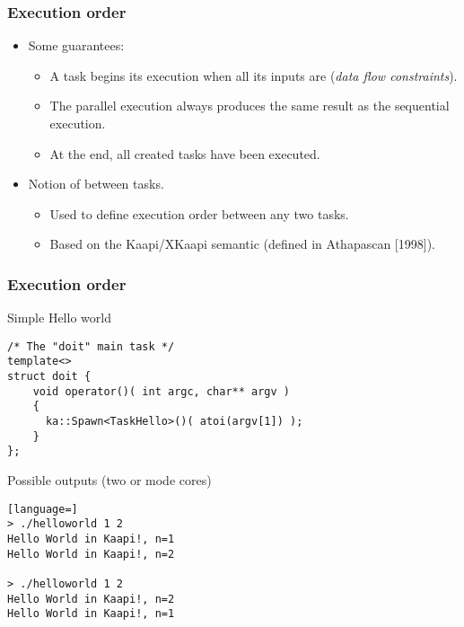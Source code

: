 \begin{frame}
  \frametitle{Execution order}
  \begin{itemize}
  \item Some guarantees:
    \begin{itemize}
    \item A task begins its execution when all its inputs are 
      (\emph{data flow constraints}).
    \item  The parallel execution always produces the same result
      as the sequential execution.
    \item At the end, all created tasks have been executed. 
    \end{itemize}
  \item Notion of  between tasks.
    \begin{itemize}
    \item Used to define execution order between any two tasks.
    \item Based on the Kaapi/XKaapi semantic (defined in Athapascan [1998]).
    \end{itemize}
  \end{itemize}
\end{frame}
\begin{frame}[fragile]
  \frametitle{Execution order}
\begin{block}{Simple Hello world}
\begin{lstlisting}
/* The "doit" main task */
template<>
struct doit {
    void operator()( int argc, char** argv )
    {
      ka::Spawn<TaskHello>()( atoi(argv[1]) );
    }
};
\end{lstlisting}
\end{block}
%
\pause
%
\begin{block}{Possible outputs (two or mode cores)}
\begin{lstlisting}[language=]
> ./helloworld 1 2 
Hello World in Kaapi!, n=1
Hello World in Kaapi!, n=2

> ./helloworld 1 2 
Hello World in Kaapi!, n=2
Hello World in Kaapi!, n=1
\end{lstlisting}
\end{block}
\end{frame}
